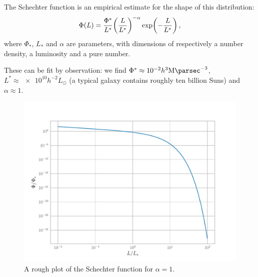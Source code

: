 \documentclass[main.tex]{subfiles}
\begin{document}





The Schechter function is an empirical estimate for the shape of this distribution:
%
\begin{equation}
  \Phi(L) = \frac{\Phi^*}{L^*} \qty(\frac{L}{L^*})^{-\alpha} \exp(-\frac{L}{L^*})
  \,,
\end{equation}
%
where \(\Phi_{*}\), \(L_{*}\) and \(\alpha \) are parameters, with dimensions of respectively a number density, a luminosity and a pure number.

These can be fit by observation: we find \(\Phi^* \approx \SI{e-2}{} h^3 \SI{}{\mega\parsec^{-3}}\), \(L^* \approx \num{e10}h^{-2} L_\odot \) (a typical galaxy contains roughly ten billion Suns) and \(\alpha \approx 1\).

\begin{figure}[ht]
\centering
\includegraphics[width=\textwidth]{figures/Schechter.pdf}
\caption{A rough plot of the Schechter function for \(\alpha = 1\).}
\label{fig:Schechter}
\end{figure}
\end{document}
